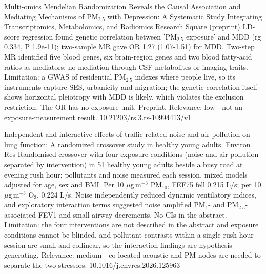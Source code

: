 \documentclass[10pt]{article}
\begin{document}

{Multi-omics Mendelian Randomization Reveals the Causal Association and Mediating Mechanisms of PM$_{2.5}$ with Depression: A Systematic Study Integrating Transcriptomics, Metabolomics, and Radiomics}
{Research Square (preprint)}
{LD-score regression found genetic correlation between 'PM$_{2.5}$ exposure' and MDD (rg 0.334, P 1.9e-11); two-sample MR gave OR 1.27 (1.07-1.51) for MDD. Two-step MR identified five blood genes, six brain-region genes and two blood fatty-acid ratios as mediators; no mediation through CSF metabolites or imaging traits. Limitation: a GWAS of residential PM$_{2.5}$ indexes where people live, so its instruments capture SES, urbanicity and migration; the genetic correlation itself shows horizontal pleiotropy with MDD is likely, which violates the exclusion restriction. The OR has no exposure unit. Preprint. Relevance: low - not an exposure-measurement result.}
{10.21203/rs.3.rs-10994413/v1}

\par{}\baselineskip{}\baselineskip
{}

{Independent and interactive effects of traffic-related noise and air pollution on lung function: A randomized crossover study in healthy young adults.}
{Environ Res}
{Randomised crossover with four exposure conditions (noise and air pollution separated by intervention) in 51 healthy young adults beside a busy road at evening rush hour; pollutants and noise measured each session, mixed models adjusted for age, sex and BMI. Per 10 $\mu$g\,m$^{-3}$ PM$_{10}$, FEF75 fell 0.215 L/s; per 10 $\mu$g\,m$^{-3}$ O$_3$, 0.224 L/s. Noise independently reduced dynamic ventilatory indices, and exploratory interaction terms suggested noise amplified PM$_{1}$- and PM$_{2.5}$-associated FEV1 and small-airway decrements. No CIs in the abstract. Limitation: the four interventions are not described in the abstract and exposure conditions cannot be blinded, and pollutant contrasts within a single rush-hour session are small and collinear, so the interaction findings are hypothesis-generating. Relevance: medium - co-located acoustic and PM nodes are needed to separate the two stressors.}
{10.1016/j.envres.2026.125963}
\end{document}
